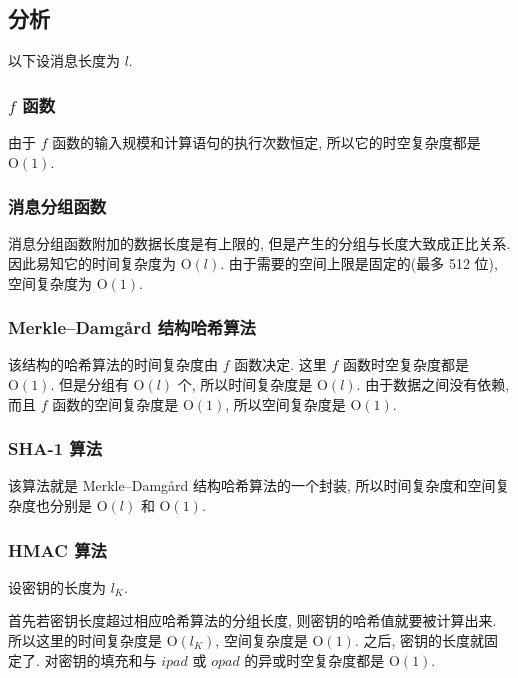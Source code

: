 \documentclass[12pt,a4paper]{article}
\begin{document}
\subsection*{分析}

以下设消息长度为 $ l $. 

\subsubsection*{$ f $ 函数}

由于 $ f $ 函数的输入规模和计算语句的执行次数恒定, 所以它的时空复杂度都是 $ \mathrm{O}(1) $.

\subsubsection*{消息分组函数}

消息分组函数附加的数据长度是有上限的, 但是产生的分组与长度大致成正比关系. 因此易知它的时间复杂度为 $ \mathrm{O}(l) $. 由于需要的空间上限是固定的(最多 512 位), 空间复杂度为 $ \mathrm{O}(1) $. 

\subsubsection*{Merkle–Damgård 结构哈希算法}

该结构的哈希算法的时间复杂度由 $ f $ 函数决定. 这里 $ f $ 函数时空复杂度都是 $ \mathrm{O}(1) $. 但是分组有 $ \mathrm{O}(l) $ 个, 所以时间复杂度是 $ \mathrm{O}(l) $. 由于数据之间没有依赖, 而且 $ f $ 函数的空间复杂度是 $ \mathrm{O}(1) $, 所以空间复杂度是 $ \mathrm{O}(1) $. 

\subsubsection*{SHA-1 算法}

该算法就是 Merkle–Damgård 结构哈希算法的一个封装, 所以时间复杂度和空间复杂度也分别是 $ \mathrm{O}(l) $ 和 $ \mathrm{O}(1) $. 

\subsubsection*{HMAC 算法}

设密钥的长度为 $ l_K $. 

首先若密钥长度超过相应哈希算法的分组长度, 则密钥的哈希值就要被计算出来. 所以这里的时间复杂度是 $ \mathrm{O}(l_K) $, 空间复杂度是 $ \mathrm{O}(1) $. 之后, 密钥的长度就固定了. 对密钥的填充和与 $ ipad $ 或 $ opad $ 的异或时空复杂度都是 $ \mathrm{O}(1) $. 
\end{document}

